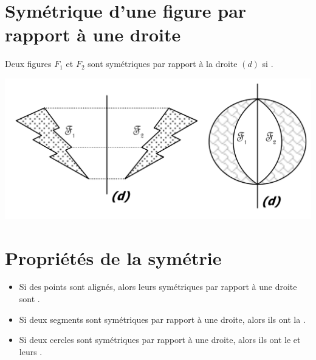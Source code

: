 \documentclass[12pt,a4paper]{article}
\begin{document}
\section{Symétrique  d'une figure par rapport à une droite}

	\begin{mydef}
		Deux figures $F_1$ et $F_2$ sont symétriques par rapport à la droite $(d)$ si .
		
		
		\begin{center}
			\includegraphics[scale=0.35]{def}
		\end{center}
	\end{mydef}

\section{Propriétés de la symétrie}

	\begin{myprops}
		\begin{itemize}
			\item Si des points sont alignés, alors leurs symétriques par rapport à une droite sont .
			\item Si deux segments sont symétriques par rapport à une droite, alors ils ont la .
			\item Si deux cercles sont symétriques par rapport à une droite, alors ils ont le  et leurs .
		\end{itemize}
		
	\end{myprops}
\end{document}
